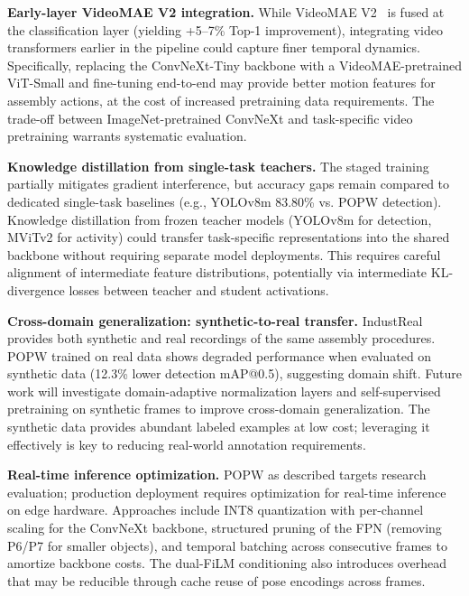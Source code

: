 \documentclass[11pt,a4paper]{article}
\begin{document}
\textbf{Early-layer VideoMAE V2 integration.} While VideoMAE V2~\cite{wang2023videomae} is fused at the classification layer (yielding +5--7\% Top-1 improvement), integrating video transformers earlier in the pipeline could capture finer temporal dynamics. Specifically, replacing the ConvNeXt-Tiny backbone with a VideoMAE-pretrained ViT-Small and fine-tuning end-to-end may provide better motion features for assembly actions, at the cost of increased pretraining data requirements. The trade-off between ImageNet-pretrained ConvNeXt and task-specific video pretraining warrants systematic evaluation.

\textbf{Knowledge distillation from single-task teachers.} The staged training partially mitigates gradient interference, but accuracy gaps remain compared to dedicated single-task baselines (e.g., YOLOv8m 83.80\% vs. POPW detection). Knowledge distillation from frozen teacher models (YOLOv8m for detection, MViTv2 for activity) could transfer task-specific representations into the shared backbone without requiring separate model deployments. This requires careful alignment of intermediate feature distributions, potentially via intermediate KL-divergence losses between teacher and student activations.

\textbf{Cross-domain generalization: synthetic-to-real transfer.} IndustReal provides both synthetic and real recordings of the same assembly procedures. POPW trained on real data shows degraded performance when evaluated on synthetic data (12.3\% lower detection mAP@0.5), suggesting domain shift. Future work will investigate domain-adaptive normalization layers and self-supervised pretraining on synthetic frames to improve cross-domain generalization. The synthetic data provides abundant labeled examples at low cost; leveraging it effectively is key to reducing real-world annotation requirements.

\textbf{Real-time inference optimization.} POPW as described targets research evaluation; production deployment requires optimization for real-time inference on edge hardware. Approaches include INT8 quantization with per-channel scaling for the ConvNeXt backbone, structured pruning of the FPN (removing P6/P7 for smaller objects), and temporal batching across consecutive frames to amortize backbone costs. The dual-FiLM conditioning also introduces overhead that may be reducible through cache reuse of pose encodings across frames.

\FloatBarrier
\end{document}
